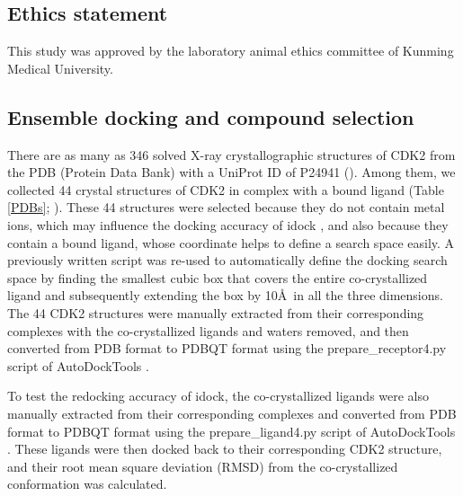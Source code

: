 \documentclass[10pt,letterpaper]{article}
\begin{document}
\subsection*{Ethics statement}

This study was approved by the laboratory animal ethics committee of Kunming Medical University.

\subsection*{Ensemble docking and compound selection}

There are as many as 346 solved X-ray crystallographic structures of CDK2 from the PDB (Protein Data Bank) \cite{540,537} with a UniProt ID of P24941 (). Among them, we collected 44 crystal structures of CDK2 in complex with a bound ligand (Table \ref{PDBs}; ). These 44 structures were selected because they do not contain metal ions, which may influence the docking accuracy of idock \cite{1362}, and also because they contain a bound ligand, whose coordinate helps to define a search space easily. A previously written script \cite{1362} was re-used to automatically define the docking search space by finding the smallest cubic box that covers the entire co-crystallized ligand and subsequently extending the box by 10\AA\ in all the three dimensions. The 44 CDK2 structures were manually extracted from their corresponding complexes with the co-crystallized ligands and waters removed, and then converted from PDB format to PDBQT format using the prepare\_receptor4.py script of AutoDockTools \cite{596}.

To test the redocking accuracy of idock, the co-crystallized ligands were also manually extracted from their corresponding complexes and converted from PDB format to PDBQT format using the prepare\_ligand4.py script of AutoDockTools \cite{596}. These ligands were then docked back to their corresponding CDK2 structure, and their root mean square deviation (RMSD) from the co-crystallized conformation was calculated.

\end{document}
